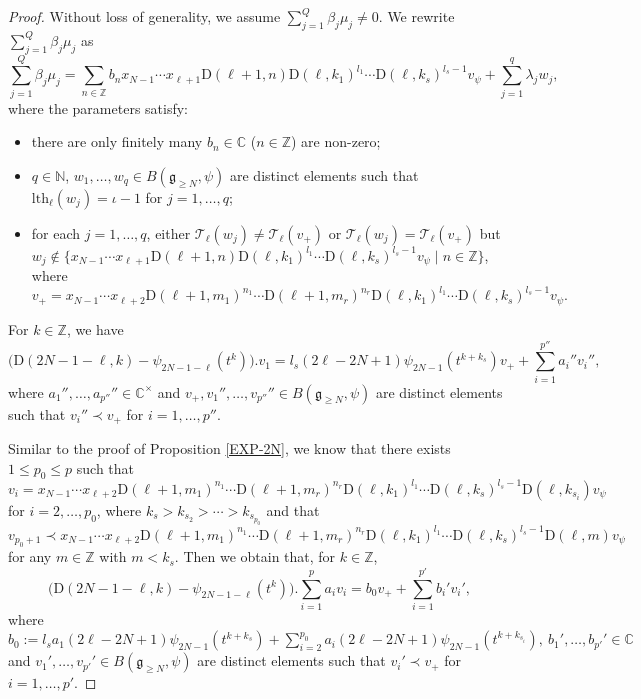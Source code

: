 \documentclass[10pt,a4paper]{amsart}
\newcommand{\C}{\mathbb{C}}
\newcommand{\N}{\mathbb N}
\newcommand{\Z}{\mathbb Z}
\newcommand{\fg}{\mathfrak g}
\newcommand{\rD}{\mathrm{D}}
\begin{document}
\begin{proof}
Without loss of generality, we assume $\sum_{j=1}^{Q}\beta_{j}\mu_{j}\neq0$.
We rewrite $\sum_{j=1}^{Q}\beta_{j}\mu_{j}$ as
\[\sum_{j=1}^{Q}\beta_{j}\mu_{j}=\sum_{n\in\Z}b_{n}x_{N-1}\cdots x_{\ell+1}\rD(\ell+1,n)\rD(\ell,k_{1})^{l_{1}}\cdots\rD(\ell,k_{s})^{l_{s}-1}v_{\psi}+\sum_{j=1}^{q}\lambda_{j}w_{j},\]
where the parameters satisfy:
\begin{itemize}
\item[(c1)] there are only finitely many $b_{n}\in\C$ ($n\in\Z$) are non-zero;
\item[(c2)] $q\in\N$, $w_{1},\dots,w_{q}\in B(\fg_{\geq N},\psi)$ are distinct elements such that
$\mathrm{lth}_{\ell}(w_{j})=\iota-1$ for $j=1,\dots,q$;
\item[(c3)] for each $j=1,\dots,q$, either $\mathcal{T}_{\ell}(w_{j})\neq \mathcal{T}_{\ell}(v_{+})$ or
$\mathcal{T}_{\ell}(w_{j})=\mathcal{T}_{\ell}(v_{+})$ but $w_{j}\not\in\{x_{N-1}\cdots x_{\ell+1}\rD(\ell+1,n)\rD(\ell,k_{1})^{l_{1}}\cdots\rD(\ell,k_{s})^{l_{s}-1}v_{\psi}\mid n\in\Z\}$,
where \[v_{+}=x_{N-1}\cdots x_{\ell+2}\rD(\ell+1,m_{1})^{n_{1}}\cdots\rD(\ell+1,m_{r})^{n_{r}}
\rD(\ell,k_{1})^{l_{1}}\cdots\rD(\ell,k_{s})^{l_{s}-1}v_{\psi}.\]
\end{itemize}

\vspace{2mm}

For $k\in\Z$, we have
$$\big(\rD(2N-1-\ell,k)-\psi_{2N-1-\ell}(t^{k})\big).v_{1}=l_{s}(2\ell-2N+1)
\psi_{2N-1}(t^{k+k_{s}})v_{+}+\sum_{i=1}^{p''}a_{i}''v_{i}'',$$
where $a_{1}'',\dots,a_{p''}''\in\C^{\times}$ and $v_{+},v_{1}'',\dots,v_{p''}''\in B(\fg_{\geq N},\psi)$
are distinct elements such that $v_{i}''\prec v_{+}$ for $i=1,\dots,p''$.


\vspace{2mm}
Similar to the proof of Proposition \ref{EXP-2N}, we know that there exists $1\leq p_{0}\leq p$ such that
\[v_{i}=x_{N-1}\cdots x_{\ell+2}\rD(\ell+1,m_{1})^{n_{1}}\cdots\rD(\ell+1,m_{r})^{n_{r}}
\rD(\ell,k_{1})^{l_{1}}\cdots\rD(\ell,k_{s})^{l_{s}-1}\rD(\ell,k_{s_{i}})v_{\psi}\]
for $i=2,\dots,p_{0}$, where $k_{s}>k_{s_{2}}>\cdots>k_{s_{p_{0}}}$ and that
\[v_{p_{0}+1}\prec x_{N-1}\cdots x_{\ell+2}\rD(\ell+1,m_{1})^{n_{1}}\cdots\rD(\ell+1,m_{r})^{n_{r}}
\rD(\ell,k_{1})^{l_{1}}\cdots\rD(\ell,k_{s})^{l_{s}-1}\rD(\ell,m)v_{\psi}\]
for any $m\in\Z$ with $m<k_{s}$. Then we obtain that, for $k\in\Z$,
$$\big(\rD(2N-1-\ell,k)-\psi_{2N-1-\ell}(t^{k})\big).\sum_{i=1}^{p}a_{i}v_{i}=b_{0}v_{+}+\sum_{i=1}^{p'}b_{i}'v_{i}',$$
where $b_{0}:=l_{s}a_{1}(2\ell-2N+1)\psi_{2N-1}(t^{k+k_{s}})+\sum_{i=2}^{p_{0}}a_{i}(2\ell-2N+1)\psi_{2N-1}(t^{k+k_{s_{i}}}),\
b_{1}',\dots,b_{p'}'\in\C$ and $v_{1}',\dots,v_{p'}'\in B(\fg_{\geq N},\psi)$ are distinct elements such that
$v_{i}'\prec v_{+}$ for $i=1,\dots,p'$.


\end{proof}
\end{document}
